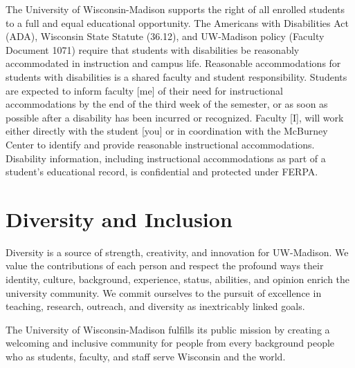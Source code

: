 \documentclass[
]{book}
\begin{document}
The University of Wisconsin-Madison supports the right of all enrolled students to a full and equal educational opportunity. The Americans with Disabilities Act (ADA), Wisconsin State Statute (36.12), and UW-Madison policy (Faculty Document 1071) require that students with disabilities be reasonably accommodated in instruction and campus life. Reasonable accommodations for students with disabilities is a shared faculty and student responsibility. Students are expected to inform faculty {[}me{]} of their need for instructional accommodations by the end of the third week of the semester, or as soon as possible after a disability has been incurred or recognized. Faculty {[}I{]}, will work either directly with the student {[}you{]} or in coordination with the McBurney Center to identify and provide reasonable instructional accommodations. Disability information, including instructional accommodations as part of a student's educational record, is confidential and protected under FERPA.

\hypertarget{diversity-and-inclusion}{%
\section{Diversity and Inclusion}\label{diversity-and-inclusion}}

Diversity is a source of strength, creativity, and innovation for UW-Madison. We value the contributions of each person and respect the profound ways their identity, culture, background, experience, status, abilities, and opinion enrich the university community. We commit ourselves to the pursuit of excellence in teaching, research, outreach, and diversity as inextricably linked goals.

The University of Wisconsin-Madison fulfills its public mission by creating a welcoming and inclusive community for people from every background people who as students, faculty, and staff serve Wisconsin and the world.

  
\end{document}
